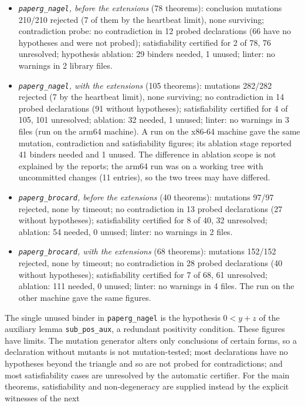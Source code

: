 \documentclass[11pt]{article}
\theoremstyle{definition}
\theoremstyle{remark}
\newcommand{\lean}[1]{\texttt{#1}}
\begin{document}
\begin{itemize}
\item \emph{\lean{paperg\_nagel}, before the extensions} (78 theorems): conclusion mutations 210/210
rejected (7 of them by the heartbeat limit), none surviving; contradiction probe: no contradiction in
12 probed declarations (66 have no hypotheses and were not probed); satisfiability certified for 2 of
78, 76 unresolved; hypothesis ablation: 29 binders needed, 1 unused; linter: no warnings in 2 library
files.
\item \emph{\lean{paperg\_nagel}, with the extensions} (105 theorems): mutations 282/282 rejected (7 by
the heartbeat limit), none surviving; no contradiction in 14 probed declarations (91 without
hypotheses); satisfiability certified for 4 of 105, 101 unresolved; ablation: 32 needed, 1 unused;
linter: no warnings in 3 files (run on the arm64 machine). A run on the x86-64 machine gave the same
mutation, contradiction and satisfiability figures; its ablation stage reported 41 binders needed and
1 unused. The difference in ablation scope is not explained by the reports; the arm64 run was on a
working tree with uncommitted changes (11 entries), so the two trees may have differed.
\item \emph{\lean{paperg\_brocard}, before the extensions} (40 theorems): mutations 97/97 rejected, none
by timeout; no contradiction in 13 probed declarations (27 without hypotheses); satisfiability
certified for 8 of 40, 32 unresolved; ablation: 54 needed, 0 unused; linter: no warnings in 2 files.
\item \emph{\lean{paperg\_brocard}, with the extensions} (68 theorems): mutations 152/152 rejected, none
by timeout; no contradiction in 28 probed declarations (40 without hypotheses); satisfiability
certified for 7 of 68, 61 unresolved; ablation: 111 needed, 0 unused; linter: no warnings in 4 files.
The run on the other machine gave the same figures.
\end{itemize}
The single unused binder in \lean{paperg\_nagel} is the hypothesis $0<y+z$ of the auxiliary lemma
\lean{sub\_pos\_aux}, a redundant positivity condition. These figures have limits. The mutation
generator alters only conclusions of certain forms, so a declaration without mutants is not
mutation-tested; most declarations have no hypotheses beyond the triangle and so are not probed for
contradictions; and most satisfiability cases are unresolved by the automatic certifier. For the main
theorems, satisfiability and non-degeneracy are supplied instead by the explicit witnesses of the next
\end{document}
